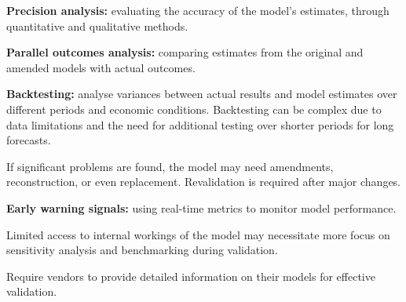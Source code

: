 \begin{lettered}
\item \textbf{Precision analysis:} evaluating the accuracy of the model's
estimates, through quantitative and qualitative methods.
\item \textbf{Parallel outcomes analysis:} comparing estimates from the original
and amended models with actual outcomes.
\item \textbf{Backtesting:} analyse variances between actual results and model
estimates over different periods and economic conditions. Backtesting can be
complex due to data limitations and the need for additional testing over shorter
periods for long forecasts.
\item If significant problems are found, the model may need amendments,
reconstruction, or even replacement. Revalidation is required after major
changes.
\item \textbf{Early warning signals:} using real-time metrics to monitor model
performance.
\end{lettered}


\begin{lettered}
\item Limited access to internal workings of the model may necessitate more focus
on sensitivity analysis and benchmarking during validation.
\item Require vendors to provide detailed information on their models for
effective validation.
\end{lettered}
